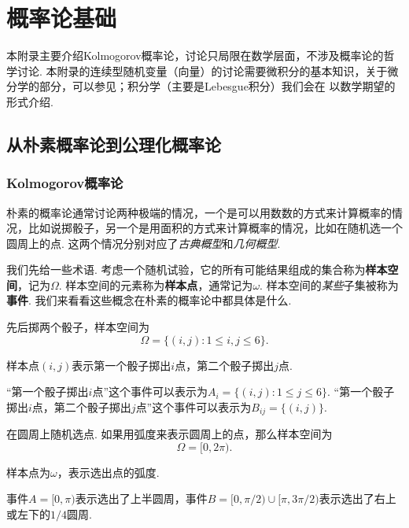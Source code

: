 \chapter{概率论基础}\label{chap:prob}

\begingroup
\newcommand{\B}{\mathscr{B}}
\renewcommand{\F}{\mathscr{F}}
\newcommand{\Exp}{\mathsf{Exp}}
\newcommand{\DExp}{\mathsf{DExp}}
\newcommand{\Lap}{\mathsf{Lap}}

本附录主要介绍Kolmogorov概率论，讨论只局限在数学层面，不涉及概率论的哲学讨论. 本附录的连续型随机变量（向量）的讨论需要微积分的基本知识，关于微分学的部分，可以参见；积分学（主要是Lebesgue积分）我们会在 以数学期望的形式介绍. 

\section{从朴素概率论到公理化概率论}

\subsection{Kolmogorov概率论}\label{subsec:kolmogorov-probability}
朴素的概率论通常讨论两种极端的情况，一个是可以用数数的方式来计算概率的情况，比如说掷骰子，另一个是用面积的方式来计算概率的情况，比如在随机选一个圆周上的点. 这两个情况分别对应了\emph{古典概型}和\emph{几何概型}. 

我们先给一些术语. 考虑一个随机试验，它的所有可能结果组成的集合称为\textbf{样本空间}，记为$\Omega$. 样本空间的元素称为\textbf{样本点}，通常记为$\omega$. 样本空间的\emph{某些}子集被称为\textbf{事件}. 我们来看看这些概念在朴素的概率论中都具体是什么. 

\begin{example}[古典概型]
先后掷两个骰子，样本空间为
\[
    \Omega = \{ (i, j): 1 \leq i, j \leq 6 \}.
\]

样本点$(i, j)$表示第一个骰子掷出$i$点，第二个骰子掷出$j$点. 

“第一个骰子掷出$i$点”这个事件可以表示为$A_i = \{ (i, j): 1 \leq j \leq 6 \}$. “第一个骰子掷出$i$点，第二个骰子掷出$j$点”这个事件可以表示为$B_{ij} = \{ (i, j) \}$.
\end{example}

\begin{example}[几何概型]
在圆周上随机选点. 如果用弧度来表示圆周上的点，那么样本空间为
\[
    \Omega = [0, 2\pi).
\]

样本点为$\omega$，表示选出点的弧度. 

事件$A = [0, \pi)$表示选出了上半圆周，事件$B = [0, \pi/2)\cup[\pi, 3\pi/2)$表示选出了右上或左下的$1/4$圆周. 
\end{example}

